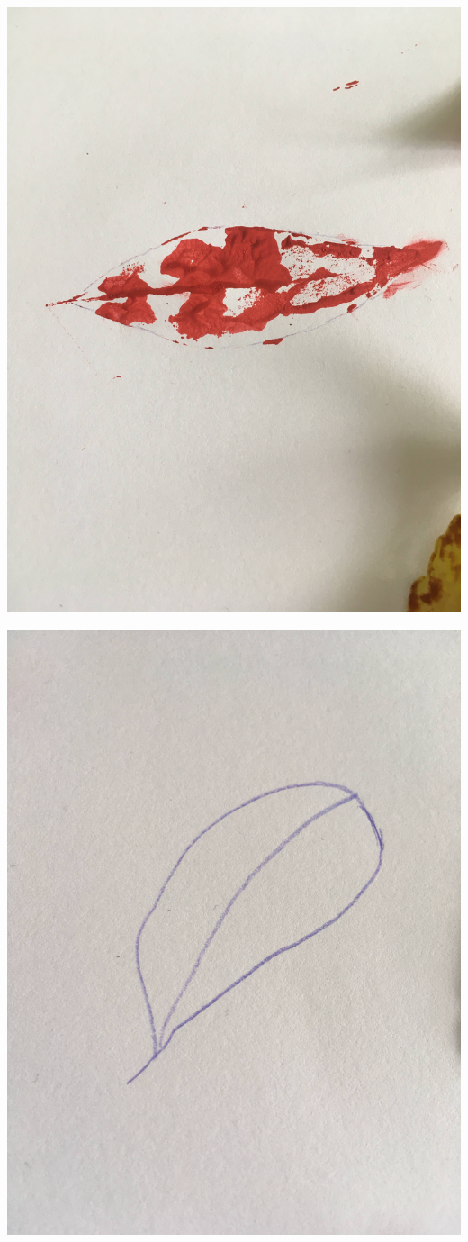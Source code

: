 \documentclass[12pt, letter]{article}
\begin{document}
\includegraphics[width=\textwidth,height=\textheight,keepaspectratio]{leaf-print.jpg}
\newpage

\includegraphics[width=\textwidth,height=\textheight,keepaspectratio]{leaf-singleline.jpg}
\end{document}

